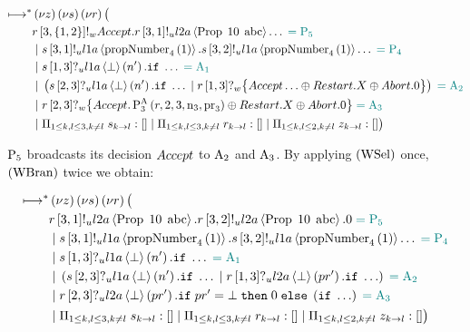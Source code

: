 \begin{align*}
\mapstostar& \NuChannels \big (\\
&
    \mSendWeaklyP{\ChannelR}{3}{\Curly{1, 2}}{\Accept}.
    \SendUnreliableP{\ChannelR}{3}{1}{\LTwoA}{\ProposalC{10}{\ABC}}\ldots
    \comment{= \Proposer{5}}\\
&\Or \SendUnreliableP{\ChannelS}{3}{1}{\LOneA}{\proposalNumber{1}{4}}.\SendUnreliableP{\ChannelS}{3}{2}{\LOneA}{\proposalNumber{1}{4}}\ldots \comment{= \Proposer{4}}\\
&\Or \ReceiveUnreliableP{\ChannelS}{1}{3}{\LOneA}{\bot}{n'}.\mIf \ldots \comment{= \Acceptor{1}}\\
&\Or \Paren{
    \ReceiveUnreliableP{\ChannelS}{2}{3}{\LOneA}{\bot}{n'}.\mIf \ldots
    \Or \ReceiveWeaklyP{\ChannelR}{1}{3}{\BeginPaCont}
} \comment{= \Acceptor{2}}\\
&\Or
    \ReceiveWeaklyP{\ChannelR}{2}{3}{
        \Accept. \PaThree{\ChannelR, 2, 3, \NumberRegister_3, \ProposalRegister_3} \oplus \Restart. \RecursionVariable \oplus \Abort . \End
    }
    \comment{= \Acceptor{3}}\\
&\Or \InnerSessionQueues{\ChannelS}
\Or \InnerSessionQueues{\ChannelR}
\Or \OuterSessionQueues
\big )
\end{align*}

$\Proposer{5}$ broadcasts its decision $\Accept$ to $\Acceptor{2}$ and $\Acceptor{3}$.
By applying $\RWsel$ once, $\RWbran$ twice we obtain:

\begin{align*}
\mapstostar& \NuChannels \big (\\
&
    \SendUnreliableP{\ChannelR}{3}{1}{\LTwoA}{\ProposalC{10}{\ABC}}.
    \SendUnreliableP{\ChannelR}{3}{2}{\LTwoA}{\ProposalC{10}{\ABC}}.
    \End
    \comment{= \Proposer{5}}\\
&\Or
    \SendUnreliableP{\ChannelS}{3}{1}{\LOneA}{\proposalNumber{1}{4}}.
    \SendUnreliableP{\ChannelS}{3}{2}{\LOneA}{\proposalNumber{1}{4}}\ldots
    \comment{= \Proposer{4}}\\
&\Or \ReceiveUnreliableP{\ChannelS}{1}{3}{\LOneA}{\bot}{n'}.\mIf \ldots \comment{= \Acceptor{1}}\\
&\Or \Paren{
    \ReceiveUnreliableP{\ChannelS}{2}{3}{\LOneA}{\bot}{n'}.\mIf \ldots
    \Or \ReceiveUnreliableP{\ChannelR}{1}{3}{\LTwoA}{\bot}{pr'}.\mIf \ldots
} \comment{= \Acceptor{2}}\\
&\Or
    \ReceiveUnreliableP{\ChannelR}{2}{3}{\LTwoA}{\bot}{pr'}.
    \mIf pr' = \bot
    \;\mThen \End
    \;\mElse \Paren{\mIf \ldots}
    \comment{= \Acceptor{3}}\\
&\Or \InnerSessionQueues{\ChannelS}
\Or \InnerSessionQueues{\ChannelR}
\Or \OuterSessionQueues
\big )
\end{align*}

